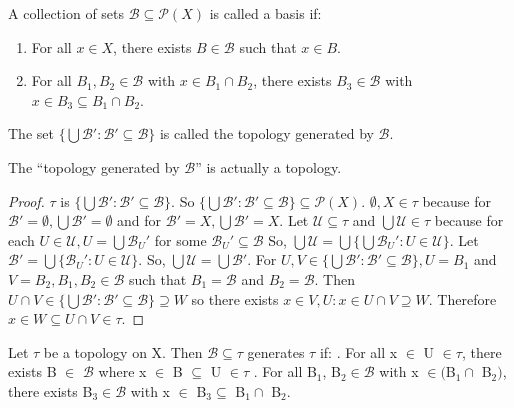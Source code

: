 \documentclass{article}
\begin{document}
	\begin{definition}
		A collection of sets \(\mathcal{B}\subseteq\mathcal{P}(X)\) is
		called a basis if:
		\begin{enumerate}
			\item For all \(x\in X\), there exists \(B\in\mathcal{B}\) such that
			\(x\in B\).
			\item  For all \(B_1,B_2 \in \mathcal{B}\) with \(x \in B_1 \cap B_2\), there exists \(B_3 \in \mathcal{B}\) with
			\(x\in B_3 \subseteq B_1 \cap B_2\).
		\end{enumerate}
	  The set \(\{\bigcup\mathcal{B}':\mathcal{B}'\subseteq\mathcal{B}\}\)
		is called the topology generated by \(\mathcal{B}\).
	\end{definition}

	\begin{theorem}
		The ``topology generated by \(\mathcal{B}\)'' is actually a topology.
	\end{theorem}
	\begin{proof}
	$\tau$ is $\lbrace \bigcup \mathcal{B}' : \mathcal{B}' \subseteq \mathcal{B} \rbrace$. So $\lbrace \bigcup \mathcal{B}' : \mathcal{B}' \subseteq \mathcal{B} \rbrace \subseteq \mathcal{P}(X)$. $\emptyset, X \in \tau$ because for $\mathcal{B}' = \emptyset, \bigcup \mathcal{B}' = \emptyset$ and for $\mathcal{B}' = X, \bigcup \mathcal{B}' = X$. Let $\mathcal{U} \subseteq \tau$ and $\bigcup \mathcal{U} \in \tau$ because for each $U \in \mathcal{U}, U = \bigcup \mathcal{B}_{U}'$ for some $\mathcal{B}_{U}' \subseteq \mathcal{B}$ So, $\bigcup \mathcal{U} = \bigcup \lbrace \bigcup \mathcal{B}_{U}' : U \in \mathcal{U} \rbrace$. Let $\mathcal{B}' = \bigcup \lbrace \mathcal{B}_{U}' : U \in \mathcal{U} \rbrace.$ So, $\bigcup \mathcal{U} = \bigcup \mathcal{B}'.$ \newline For $U, V \in \lbrace \bigcup \mathcal{B}' : \mathcal{B}' \subseteq \mathcal{B} \rbrace, U = B_1$ and $V = B_2, B_1, B_2 \in \mathcal{B}$ such that $B_1 = \mathcal{B}$ and $B_2 = \mathcal{B}$. Then $U \cap V \in \lbrace \bigcup \mathcal{B}' : \mathcal{B}' \subseteq \mathcal{B} \rbrace \supseteq W$ so there exists $x \in V, U : x \in U \cap V \supseteq W$. Therefore $x \in W \subseteq U \cap V \in \tau$.
	\end{proof}
	\begin{theorem}
	Let $\tau$ be a topology on X. Then $\mathcal{B} \subseteq \tau$ generates $\tau$ if:
	. For all x $\in$ U $\in \tau$, there exists B $\in$ $\mathcal{B}$ where x $\in$ B $\subseteq$ U $\in \tau$
	. For all B$_1$, B$_2 \in \mathcal{B}$ with x $\in ($B$_1 \cap$ B$_2)$, there exists B$_3 \in \mathcal{B}$ with x $\in$ B$_3 \subseteq$ B$_1 \cap$ B$_2$.
\end{theorem}
\end{document}
